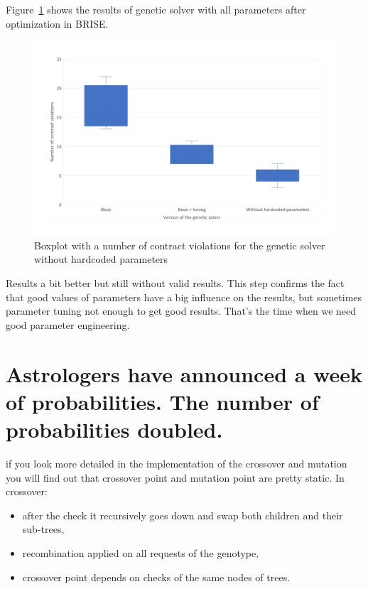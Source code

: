Figure~\ref{fig:boxplotsolverNoHardcodedTuning} shows the results of genetic solver with all parameters after optimization in BRISE.
\begin{figure}
	\centering
	\includegraphics[width=\textwidth]{images/BoxPlotSolverNoHardcodedTuning.pdf}
	\caption[Boxplot with a number of contract violations for the genetic solver without hardcoded parameters]{Boxplot with a number of contract violations for the genetic solver without hardcoded parameters}
	\label{fig:boxplotsolverNoHardcodedTuning}
\end{figure}
Results a bit better but still without valid results.
This step confirms the fact that good values of parameters have a big influence on the results, but sometimes parameter tuning not enough to get good results.
That's the time when we need good parameter engineering. 

\section{Astrologers have announced a week of probabilities. The number of probabilities doubled.}
if you look more detailed in the implementation of the crossover and mutation you will find out that crossover point and mutation point are pretty static.
In crossover:
\begin{itemize}
	\item after the check it recursively goes down and swap both children and their sub-trees,
	\item recombination applied on all requests of the genotype,
	\item crossover point depends on checks of the same nodes of trees.
\end{itemize}

